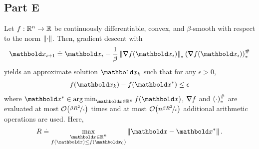 \documentclass{tufte-handout}
\begin{document}
\subsection{Part E}
\begin{thm}\label{thm:part:1F:1}
Let $f : \mathbb{R}^n \to \mathbb{R}$ be continuously differentiable, convex, and $\beta$-smooth with respect to the norm $\left\| \cdot \right\|$. Then, gradient descent with \begin{align}
    \vx_{i+1} \defeq \vx_i - \frac{1}{\beta} \norm{\grad f(\vx_i)}_* \dvm{\grad f(\vx_i)}_*
\end{align} yields an approximate solution $\vx_k$ such that for any $\epsilon > 0$, \begin{align*}
    f(\vx_k) - f(\s{\vx}) \leq \epsilon
\end{align*} where $\s{\vx} \in \argmin_{\vx \in \R^n} f(\vx)$, $\nabla\!\!\!\!\!\nabla f$ and $\left( \cdot \right)^\#_*$ are evaluated at most $\LandauO{\nicefrac{\beta R^2}{\epsilon}}$ times and at most $\LandauO{n \nicefrac{\beta R^2}{\epsilon}}$ additional arithmetic operations are used. Here, \begin{align}
    R \defeq \max_{\substack{\vx \in \R^n \\ f(\vx) \leq f(\vx_0)}} \norm{\vx - \s{\vx}}.
\end{align}
\end{thm}
\end{document}
